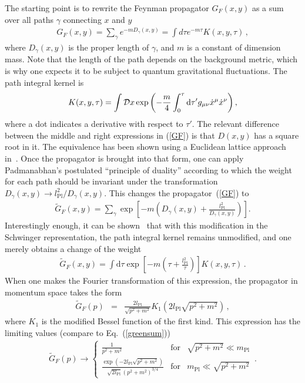 \documentclass{article}
\def\beqn{\begin{eqnarray}}
\def\eeqn{\end{eqnarray}}
\begin{document}
The starting point is to
rewrite the Feynman propagator $G_F(x,y)$ as a sum over all paths $\gamma$ connecting $x$ and $y$
\beqn
G_F(x,y) = \sum_{\gamma} e^{-m D_{\gamma}(x,y)} = \int d\tau e^{-m \tau} K(x,y,\tau) \,, \label{GF}
\eeqn
where $D_\gamma (x,y)$ is the proper length of $\gamma$, and
$m$ is a constant of dimension mass. Note that the length of the path depends on the background metric, which is why one
expects it to be subject to quantum gravitational fluctuations. The path integral kernel is
\beqn
K(x,y,\tau) = \int {\cal D} x \exp \left( -\frac{m}{4} \int_0^\tau \mathrm{d}\tau' g_{\mu\nu} \dot x^\mu \dot x^\nu \right) ,
\eeqn
where a dot indicates a derivative with respect to $\tau'$.
The relevant difference between the middle and right expressions in (\ref{GF}) is that $D(x,y)$ has a square root in it. 
The equivalence has been shown using a Euclidean lattice approach in~\cite{Padmanabhan:1998yya}. Once
the propagator is brought into that form, one can apply Padmanabhan's postulated ``principle of duality'' according
to which the weight for each path should be invariant under the transformation $D_\gamma(x,y) \to l^2_{\mathrm{Pl}}/D_\gamma(x,y)$.
This changes the propagator~(\ref{GF}) to
\beqn
\widetilde G_F(x,y) = \sum_{\gamma} \exp\left[ -m \left( D_\gamma(x,y) + \frac{l_{\mathrm{Pl}}^2}{D_\gamma(x,y)} \right) \right] . \label{GFtilde}
\eeqn
Interestingly enough, it can be shown~\cite{Padmanabhan:1998yya} that with this modification in the Schwinger representation, the path integral 
kernel remains unmodified, and one merely obtains a change of the weight 
\beqn
\widetilde G_F(x,y) = \int \mathrm{d}\tau \exp\left[ - m \left( \tau + \frac{l_{\mathrm{Pl}}^2}{\tau} \right) \right] K(x,y,\tau) \,. 
\eeqn
When one makes the Fourier transformation of this expression, the propagator in momentum space takes the form
\beqn
\widetilde G_F(p) &=& \frac{2l_{\mathrm{Pl}}}{\sqrt{p^2 + m^2}} K_1( 2l_{\mathrm{Pl}} \sqrt{p^2 + m^2}) \,,
\eeqn
where $K_1$ is the modified Bessel function of the first kind. This expression has the limiting values (compare to Eq.~(\ref{greensum}))
\beqn
\widetilde G_F(p) \to \left\{ 
\begin{array}{lll} 
\displaystyle \frac{1}{p^2 + m^2}  & {\mbox{for}} & \sqrt{p^2 + m^2} \ll m_{\mathrm{Pl}} \\
\displaystyle \frac{\exp(-2 l_{\mathrm{Pl}} \sqrt{p^2 + m^2})}{\sqrt{2 l_{\mathrm{Pl}}} (p^2 + m^2)^{3/4}} & {\mbox{for}} & m_{\mathrm{Pl}} \ll \sqrt{p^2 + m^2} 
\end{array}\right. \,.
\eeqn 
\end{document}
